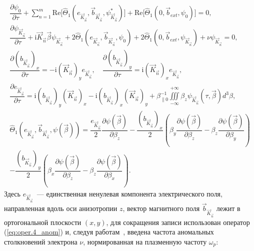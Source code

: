 \begin{align}
\label{eq:f0.4_anom}
\dfrac{\partial \psi_0}{\partial \tau}+\sum\limits^{m}_{n=1}\mathrm{Re}\Bigg[\hat \Theta_1\left(e_{\vec{K}_{\vec{n}}},{\vec{b}}_{\vec{K}_{\vec{n}}},\psi_{\vec{K}_{\vec{n}}}^*\right)\Bigg]+\mathrm{Re}\Bigg[\hat \Theta_1\left(0,{\vec{b}}_{ext},\psi_{0}\right)\Bigg]=0,\\
\label{eq:f1.4_anom}
\dfrac{\partial \psi_{\vec{K}_{\vec{n}}}}{\partial \tau}+\mathrm{i}\vec{K}_{\vec{n}}\overrightarrow{\beta}\psi_{\vec{K}_{\vec{n}}}+2\hat \Theta_1\left(e_{\vec{K}_{\vec{n}}},{\vec{b}}_{\vec{K}_{\vec{n}}},\psi_{0}\right)+2\hat \Theta_1\left(0,{\vec{b}}_{ext},\psi_{\vec{K}_{\vec{n}}}\right)+\nu\psi_{\vec{K}_{\vec{n}}}=0,\\
\label{eq:maxw3.2_anom}
\dfrac{\partial \left({b}_{\vec{K}_{\vec{n}}}\right)_x}{\partial \tau}=-\mathrm{i}\left(\vec{K}_{\vec{n}}\right)_ye_{\vec{K}_{\vec{n}}},\quad 
    \dfrac{\partial \left({b}_{\vec{K}_{\vec{n}}}\right)_y}{\partial \tau}=\mathrm{i}\left(\vec{K}_{\vec{n}}\right)_xe_{\vec{K}_{\vec{n}}}, \\
\label{eq:maxw3.3_anom}
\dfrac{\partial e_{\vec{K}_{\vec{n}}}}{\partial \tau}=\mathrm{i}\left({b}_{\vec{K}_{\vec{n}}}\right)_y\left(\vec{K}_{\vec{n}}\right)_x-\mathrm{i}\left({b}_{\vec{K}_{\vec{n}}}\right)_x\left(\vec{K}_{\vec{n}}\right)_y+\beta_{\|0}^{-1}{\iiint\limits^{+\infty}_{-\infty}\beta_z\psi_{\vec{K}_{\vec{n}}}(\tau,\overrightarrow{\beta})d^3\beta} ,\\
\label{eq:oper.4_anom}
\hat \Theta_1\left(e_{\vec{K}_{\vec{n}}},{\vec{b}}_{\vec{K}_{\vec{n}}},\psi(\overrightarrow{\beta})\right)  =  \dfrac{e_{\vec{K}_{\vec{n}}}}{2}\dfrac{\partial \psi(\overrightarrow{\beta})}{\partial \beta_z}-\dfrac{\left({b}_{\vec{K}_{\vec{n}}}\right)_x}{2} \left(\beta_y\dfrac{\partial \psi(\overrightarrow{\beta})}{\partial \beta_z}-\beta_z\dfrac{\partial \psi(\overrightarrow{\beta})}{\partial \beta_y}\right) \nonumber \\
-\dfrac{\left({b}_{\vec{K}_{\vec{n}}}\right)_y}{2} \left(\beta_x\dfrac{\partial \psi(\overrightarrow{\beta})}{\partial \beta_z}-\beta_z\dfrac{\partial \psi(\overrightarrow{\beta})}{\partial \beta_x}\right) .
\end{align}
Здесь $e_{\vec{K}_{\vec{n}}}$~--- единственная ненулевая компонента электрического поля, направленная вдоль оси анизотропии $z$, вектор магнитного поля ${\vec{b}}_{\vec{K}_{\vec{n}}}$ лежит в ортогональной плоскости $(x,y)$, для сокращения записи использован оператор (\ref{eq:oper.4_anom}) и, следуя работам~\cite{Romanov2004,Korzhimanov2025,Hellinger2014,Lazar2023}, введена  частота аномальных столкновений электрона $\nu$, нормированная на плазменную частоту $\omega_p$:
